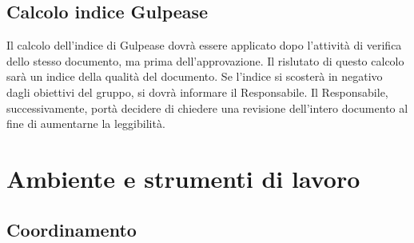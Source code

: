 \subsection{Calcolo indice Gulpease}
Il calcolo dell'indice di Gulpease dovrà essere applicato dopo l'attività di verifica dello stesso documento, ma prima dell'approvazione. Il rislutato di questo calcolo sarà un indice della qualità del documento. Se l'indice si scosterà in negativo dagli obiettivi del gruppo, si dovrà informare il Responsabile. Il Responsabile, successivamente, portà decidere di chiedere una revisione dell'intero documento al fine di aumentarne la leggibilità.


\newpage
\section{Ambiente e strumenti di lavoro}
\label{4.0}

\subsection{Coordinamento}
\label{}


